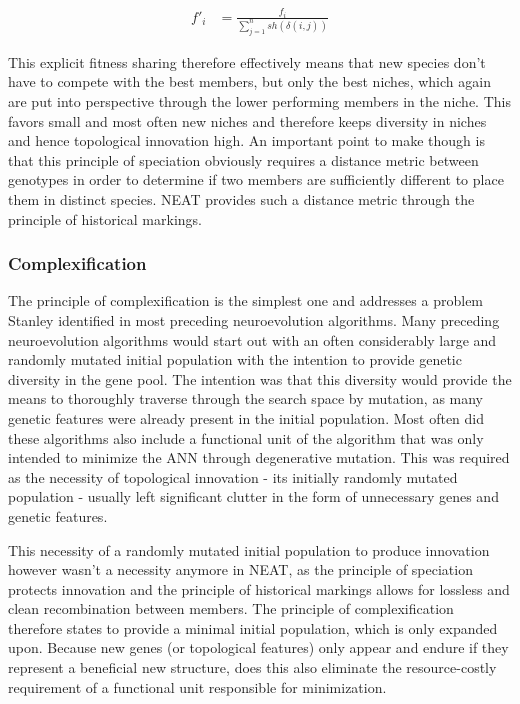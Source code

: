 \documentclass[journal, a4paper]{IEEEtran}
\begin{document}
\begin{align}
    f'_i &= \frac{f_i}{\sum_{j=1}^{n} sh(\delta(i,j))}
\end{align}

This explicit fitness sharing therefore effectively means that new species don't have to compete with the best members, but only the best niches, which again are put into perspective through the lower performing members in the niche. This favors small and most often new niches and therefore keeps diversity in niches and hence topological innovation high. An important point to make though is that this principle of speciation obviously requires a distance metric between genotypes in order to determine if two members are sufficiently different to place them in distinct species. NEAT provides such a distance metric through the principle of historical markings.



\subsubsection{Complexification}
The principle of complexification is the simplest one and addresses a problem Stanley identified in most preceding neuroevolution algorithms. Many preceding neuroevolution algorithms would start out with an often considerably large and randomly mutated initial population with the intention to provide genetic diversity in the gene pool. The intention was that this diversity would provide the means to thoroughly traverse through the search space by mutation, as many genetic features were already present in the initial population. Most often did these algorithms also include a functional unit of the algorithm that was only intended to minimize the ANN through degenerative mutation. This was required as the necessity of topological innovation - its initially randomly mutated population - usually left significant clutter in the form of unnecessary genes and genetic features.

This necessity of a randomly mutated initial population to produce innovation however wasn't a necessity anymore in NEAT, as the principle of speciation protects innovation and the principle of historical markings allows for lossless and clean recombination between members. The principle of complexification therefore states to provide a minimal initial population, which is only expanded upon. Because new genes (or topological features) only appear and endure if they represent a beneficial new structure, does this also eliminate the resource-costly requirement of a functional unit responsible for minimization.
\end{document}
